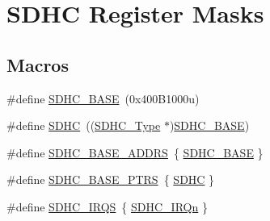 \hypertarget{group___s_d_h_c___register___masks}{}\section{S\+D\+HC Register Masks}
\label{group___s_d_h_c___register___masks}
\subsection*{Macros}
\begin{DoxyCompactItemize}
\item 
\#define \mbox{\hyperlink{group___s_d_h_c___register___masks_gae62cd2bf9b9c484123918db65cc4834b}{S\+D\+H\+C\+\_\+\+B\+A\+SE}}~(0x400\+B1000u)
\item 
\#define \mbox{\hyperlink{group___s_d_h_c___register___masks_gadfa975565f8f38eb596ca3ed92df30c8}{S\+D\+HC}}~((\mbox{\hyperlink{struct_s_d_h_c___type}{S\+D\+H\+C\+\_\+\+Type}} $\ast$)\mbox{\hyperlink{group___s_d_h_c___register___masks_gae62cd2bf9b9c484123918db65cc4834b}{S\+D\+H\+C\+\_\+\+B\+A\+SE}})
\item 
\#define \mbox{\hyperlink{group___s_d_h_c___register___masks_gac247c4777a4c8704d90501a085108593}{S\+D\+H\+C\+\_\+\+B\+A\+S\+E\+\_\+\+A\+D\+D\+RS}}~\{ \mbox{\hyperlink{group___s_d_h_c___register___masks_gae62cd2bf9b9c484123918db65cc4834b}{S\+D\+H\+C\+\_\+\+B\+A\+SE}} \}
\item 
\#define \mbox{\hyperlink{group___s_d_h_c___register___masks_gaba68469bfde58472af9853b68fee61de}{S\+D\+H\+C\+\_\+\+B\+A\+S\+E\+\_\+\+P\+T\+RS}}~\{ \mbox{\hyperlink{group___s_d_h_c___register___masks_gadfa975565f8f38eb596ca3ed92df30c8}{S\+D\+HC}} \}
\item 
\#define \mbox{\hyperlink{group___s_d_h_c___register___masks_gac8a2a352713668bfc1ee4dc28bb16783}{S\+D\+H\+C\+\_\+\+I\+R\+QS}}~\{ \mbox{\hyperlink{group___interrupt__vector__numbers_gga666eb0caeb12ec0e281415592ae89083a3ef698a0344956fa80957f89eded8f95}{S\+D\+H\+C\+\_\+\+I\+R\+Qn}} \}
\end{DoxyCompactItemize}
